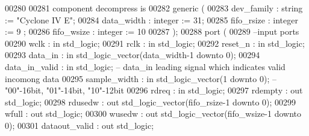 \begin{DoxyCode}
00280 
00281 \textcolor{keywordflow}{component} decompress \textcolor{keywordflow}{is}
00282   \textcolor{keywordflow}{generic} (
00283             dev_family      : \textcolor{comment}{string}  := \textcolor{keyword}{"Cyclone IV E"};
00284             data_width      : \textcolor{comment}{integer} := \textcolor{vhdllogic}{}\textcolor{vhdllogic}{31};
00285             fifo_rsize      : \textcolor{comment}{integer} := \textcolor{vhdllogic}{}\textcolor{vhdllogic}{9} ;
00286             fifo_wsize      : \textcolor{comment}{integer} := \textcolor{vhdllogic}{}\textcolor{vhdllogic}{10}
00287             );
00288   \textcolor{keywordflow}{port} (
00289 \textcolor{keyword}{        --input ports }
00290             wclk          : \textcolor{keywordflow}{in} \textcolor{comment}{std\_logic};
00291             rclk          : \textcolor{keywordflow}{in} \textcolor{comment}{std\_logic};
00292             reset_n       : \textcolor{keywordflow}{in} \textcolor{comment}{std\_logic};
00293             data_in       : \textcolor{keywordflow}{in} \textcolor{comment}{std\_logic\_vector}(data_width\textcolor{vhdlchar}{-}\textcolor{vhdllogic}{}\textcolor{vhdllogic}{1} \textcolor{keywordflow}{downto} \textcolor{vhdllogic}{}\textcolor{vhdllogic}{0});
00294             data_in_valid : \textcolor{keywordflow}{in} \textcolor{comment}{std\_logic}; \textcolor{keyword}{-- data\_in leading signal which indicates valid incomong data}
00295             sample_width  : \textcolor{keywordflow}{in} \textcolor{comment}{std\_logic\_vector}(\textcolor{vhdllogic}{}\textcolor{vhdllogic}{1} \textcolor{keywordflow}{downto} \textcolor{vhdllogic}{}\textcolor{vhdllogic}{0}); \textcolor{keyword}{-- "00"-16bit, "01"-14bit, "10"-12bit}
00296             rdreq         : \textcolor{keywordflow}{in} \textcolor{comment}{std\_logic};
00297             rdempty       : \textcolor{keywordflow}{out} \textcolor{comment}{std\_logic};
00298             rdusedw       : \textcolor{keywordflow}{out} \textcolor{comment}{std\_logic\_vector}(fifo_rsize\textcolor{vhdlchar}{-}\textcolor{vhdllogic}{}\textcolor{vhdllogic}{1} \textcolor{keywordflow}{downto} \textcolor{vhdllogic}{}\textcolor{vhdllogic}{0});
00299             wfull         : \textcolor{keywordflow}{out} \textcolor{comment}{std\_logic};
00300             wusedw        : \textcolor{keywordflow}{out} \textcolor{comment}{std\_logic\_vector}(fifo_wsize\textcolor{vhdlchar}{-}\textcolor{vhdllogic}{}\textcolor{vhdllogic}{1} \textcolor{keywordflow}{downto} \textcolor{vhdllogic}{}\textcolor{vhdllogic}{0});
00301             dataout_valid : \textcolor{keywordflow}{out} \textcolor{comment}{std\_logic};

\end{DoxyCode}
